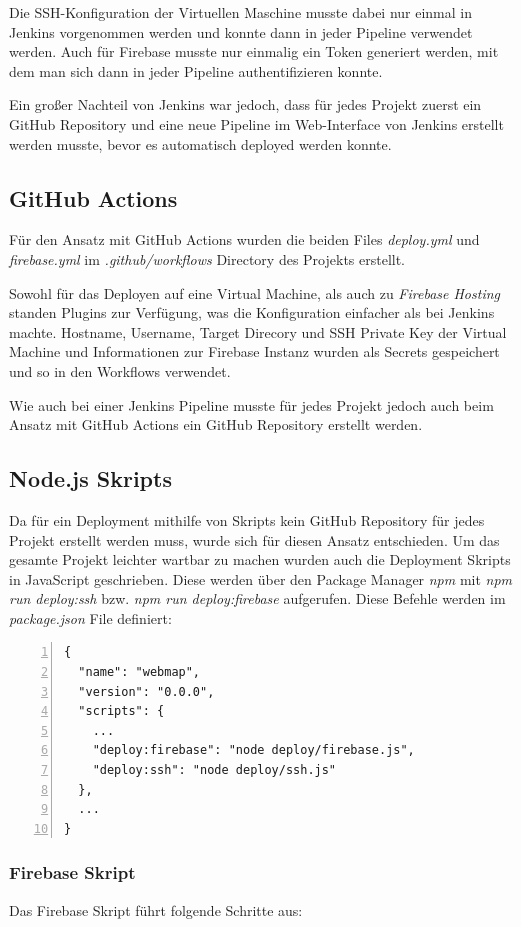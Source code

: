 Die SSH-Konfiguration der Virtuellen Maschine musste dabei nur einmal in Jenkins vorgenommen werden und konnte
dann in jeder Pipeline verwendet werden.
Auch für Firebase musste nur einmalig ein Token generiert werden, mit dem man sich dann in jeder Pipeline
authentifizieren konnte.

Ein großer Nachteil von Jenkins war jedoch, dass für jedes Projekt zuerst ein GitHub
Repository und eine neue Pipeline im Web-Interface von Jenkins erstellt werden
musste, bevor es automatisch deployed werden konnte.

\subsection{GitHub Actions}
Für den Ansatz mit GitHub Actions wurden die beiden Files \textit{deploy.yml} und \textit{firebase.yml} im
\textit{.github/workflows} Directory des Projekts erstellt.

Sowohl für das Deployen auf eine Virtual Machine, als auch zu \textit{Firebase Hosting}
standen Plugins zur Verfügung, was die Konfiguration einfacher als bei Jenkins machte.
Hostname, Username, Target Direcory und SSH Private Key der Virtual Machine und Informationen zur Firebase Instanz
wurden als Secrets gespeichert und so in den Workflows verwendet.

Wie auch bei einer Jenkins Pipeline musste für jedes Projekt jedoch auch beim
Ansatz mit GitHub Actions ein GitHub Repository erstellt werden.

\subsection{Node.js Skripts}
Da für ein Deployment mithilfe von Skripts kein GitHub Repository für jedes Projekt erstellt werden muss,
wurde sich für diesen Ansatz entschieden.
Um das gesamte Projekt leichter wartbar zu machen wurden auch die Deployment Skripts in JavaScript geschrieben.
Diese werden über den Package Manager \textit{npm} mit \textit{npm run deploy:ssh} bzw.
\textit{npm run deploy:firebase} aufgerufen.
Diese Befehle werden im \textit{package.json} File definiert:

\begin{lstlisting}[numbers=left]
{
  "name": "webmap",
  "version": "0.0.0",
  "scripts": {
    ...
    "deploy:firebase": "node deploy/firebase.js",
    "deploy:ssh": "node deploy/ssh.js"
  },
  ...
}
\end{lstlisting}

\subsubsection{Firebase Skript}
Das Firebase Skript führt folgende Schritte aus:


